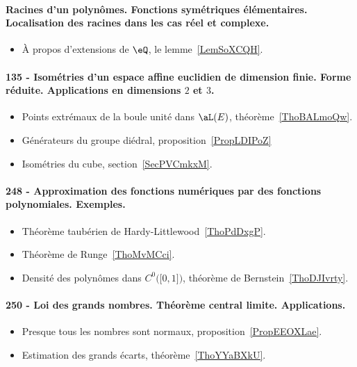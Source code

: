 \paragraph{Racines d’un polynômes. Fonctions symétriques élémentaires. Localisation des racines dans les cas réel et complexe.}
\begin{itemize}
    \item À propos d'extensions de \( \eQ\), le lemme~\ref{LemSoXCQH}.
\end{itemize}

\paragraph{135 - Isométries d'un espace affine euclidien de dimension finie. Forme réduite. Applications en dimensions $2$ et $3$.}
\begin{itemize}
    \item Points extrémaux de la boule unité dans \( \aL(E)\), théorème~\ref{ThoBALmoQw}.
    \item Générateurs du groupe diédral, proposition~\ref{PropLDIPoZ}
    \item Isométries du cube, section~\ref{SecPVCmkxM}.
\end{itemize}

\paragraph{248 - Approximation des fonctions numériques par des fonctions polynomiales. Exemples.}
\begin{itemize}
    \item Théorème taubérien de Hardy-Littlewood~\ref{ThoPdDxgP}.
    \item Théorème de Runge~\ref{ThoMvMCci}.
    \item Densité des polynômes dans \( C^0\big( \mathopen[ 0 , 1 \mathclose] \big)\), théorème de Bernstein~\ref{ThoDJIvrty}.
\end{itemize}
\paragraph{250 - Loi des grands nombres. Théorème central limite. Applications.}
\begin{itemize}
    \item Presque tous les nombres sont normaux, proposition~\ref{PropEEOXLae}.
    \item Estimation des grands écarts, théorème~\ref{ThoYYaBXkU}.
\end{itemize}
